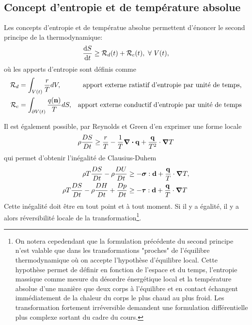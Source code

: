 \documentclass[a4paper,11pt]{report}
\newcommand{\bs}[1]{\boldsymbol{#1}}
\newcommand{\dvm}[2]{\frac{D #1}{D #2}}
\begin{document}
      \subsection{Concept d'entropie et de température absolue}
        Les concepts d'entropie et de températue absolue permettent d'énoncer le second principe de la thermodynamique:
        \begin{equation}
          \dv{S}{t} \geq \mathcal{R}_d(t) + \mathcal{R}_c(t),~\forall~V(t),
        \end{equation}
       où les apports d'entropie sont définis comme
       \begin{align*}
         \mathcal{R}_d &= \int_{V(t)} \frac{r}{T} dV, & \textrm{apport externe ratiatif d'entropie par unité de temps,}\\
         \mathcal{R}_c &= \int_{\partial V(t)} \frac{q(\vb{n})}{T}dS, & \textrm{apport externe conductif d'entropie par unité de temps}
       \end{align*}

       Il est également possible, par Reynolds et Green d'en exprimer une forme locale
       \begin{equation}
         \rho \dvm{S}{t} \geq \frac{r}{T} - \frac{1}{T}\div \vb{q} + \frac{\vb{q}}{T^2} \cdot \grad T
       \end{equation}
       qui permet d'obtenir l'inégalité de Clausius-Duhem
       \begin{gather}
         \begin{aligned}
           \rho T \dvm{S}{t} - \rho \dvm{U}{t} &\geq - \bs{\sigma} : \vb{d} + \frac{\vb{q}}{T} \cdot \grad T,\\
           \rho T \dvm{S}{t} - \rho \dvm{H}{t} + \dvm{p}{t} &\geq - \bs{\tau} : \vb{d} + \frac{\vb{q}}{T} \cdot \grad T
         \end{aligned}
       \end{gather}
       Cette inégalité doit être en tout point et à tout moment. Si il y a égalité, il y a alors réversibilité locale de la transformation\footnote{On notera cepedendant que la formulation précédente du second principe n'est valable que dans les transformations "proches" de l'équilibre thermodynamique où on accepte l'hypothèse d'équilibre local. Cette hypothèse permet de définir en fonction de l'espace et du temps, l'entropie massique comme mesure du désordre énergétique local et la température absolue d'une manière que deux corps à l'équilibre et en contact échangent immédiatement de la chaleur du corps le plus chaud au plus froid. Les transformation fortement irréversible demandent une formulation différentielle plus complexe sortant du cadre du cours.}.
\end{document}

